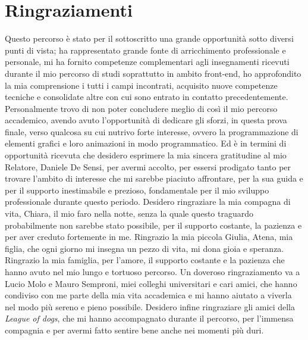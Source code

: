 \documentclass[binding=0.6cm]{sapthesis}
\begin{document}
\chapter*{Ringraziamenti}
\rhead{}
Questo percorso è stato per il sottoscritto una grande opportunità sotto diversi punti di vista; ha rappresentato grande fonte di arricchimento 
professionale e personale, mi ha fornito competenze complementari
agli insegnamenti ricevuti durante il mio percorso di studi soprattutto in ambito front-end, 
ho approfondito la mia comprensione i tutti i campi incontrati, acquisito nuove competenze tecniche e consolidate altre con cui sono entrato in contatto precedentemente.
Personalmente trovo di non poter concludere meglio di così il mio percorso accademico, 
avendo avuto l'opportunità di dedicare gli sforzi, in questa prova finale, verso qualcosa su cui nutrivo forte interesse, ovvero la programmazione di elementi grafici e loro animazioni in modo programmatico.
Ed è in termini di opportunità ricevuta che desidero esprimere la mia sincera gratitudine al mio Relatore, Daniele De Sensi, per avermi accolto,
per essersi prodigato tanto per trovare l'ambito di interesse che mi sarebbe piaciuto affrontare, per la sua guida e per il
supporto inestimabile e prezioso, fondamentale per il mio sviluppo professionale durante questo periodo.
\newline
\newline
Desidero ringraziare la mia compagna di vita, Chiara, il mio faro nella notte, senza la quale questo traguardo probabilmente
 non sarebbe stato possibile, per il supporto costante, la pazienza e per aver creduto fortemente in me. Ringrazio la mia piccola Giulia, Atena, mia figlia,
che ogni giorno mi insegna un pezzo di vita, mi dona gioia e speranza. 
\newline
\newline
Ringrazio la mia famiglia, per l'amore, il supporto costante e la pazienza che hanno avuto nel mio lungo e tortuoso percorso.
\newline
\newline
Un doveroso ringraziamento va a Lucio Molo e Mauro Semproni, miei colleghi universitari e cari amici, che hanno condiviso con me parte della mia vita
accademica e mi hanno aiutato a viverla nel modo più sereno e pieno possibile.
\newline
\newline
Desidero infine ringraziare gli amici della \textit{League of dogs}, che mi hanno accompagnato durante il percorso, per l'immensa
compagnia e per avermi fatto sentire bene anche nei momenti più duri.



\printbibliography

\backmatter
\cleardoublepage
{} %
\end{document}

